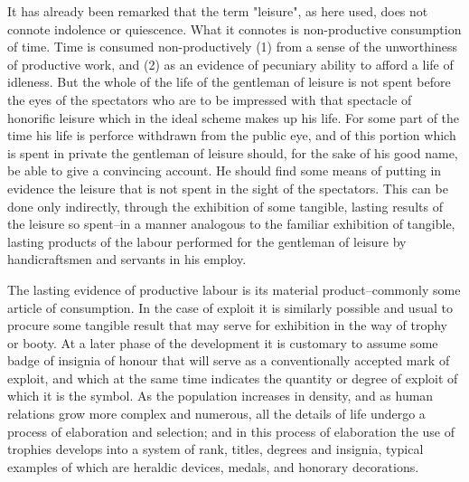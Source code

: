 \documentclass[12pt]{report}
\begin{document}
It has already been remarked that the term "leisure", as here used, does
not connote indolence or quiescence. What it connotes is non-productive
consumption of time. Time is consumed non-productively (1) from a
sense of the unworthiness of productive work, and (2) as an evidence
of pecuniary ability to afford a life of idleness. But the whole of the
life of the gentleman of leisure is not spent before the eyes of the
spectators who are to be impressed with that spectacle of honorific
leisure which in the ideal scheme makes up his life. For some part of
the time his life is perforce withdrawn from the public eye, and of this
portion which is spent in private the gentleman of leisure should, for
the sake of his good name, be able to give a convincing account. He
should find some means of putting in evidence the leisure that is not
spent in the sight of the spectators. This can be done only indirectly,
through the exhibition of some tangible, lasting results of the leisure
so spent--in a manner analogous to the familiar exhibition of tangible,
lasting products of the labour performed for the gentleman of leisure by
handicraftsmen and servants in his employ.

The lasting evidence of productive labour is its material
product--commonly some article of consumption. In the case of exploit it
is similarly possible and usual to procure some tangible result that may
serve for exhibition in the way of trophy or booty. At a later phase
of the development it is customary to assume some badge of insignia of
honour that will serve as a conventionally accepted mark of exploit, and
which at the same time indicates the quantity or degree of exploit of
which it is the symbol. As the population increases in density, and as
human relations grow more complex and numerous, all the details of life
undergo a process of elaboration and selection; and in this process of
elaboration the use of trophies develops into a system of rank, titles,
degrees and insignia, typical examples of which are heraldic devices,
medals, and honorary decorations.
\end{document}
